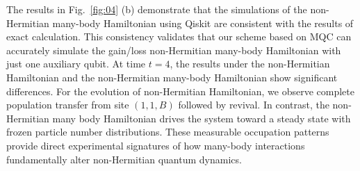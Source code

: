 \documentclass[longbibliography, aps, prx, amsmath, amssymb, amsfonts, twocolumn,superscriptaddress, footinbib]{revtex4-1}
\begin{document}
	The results in Fig.~\ref{fig:04} (b) demonstrate that the simulations of the non-Hermitian many-body Hamiltonian using Qiskit are consistent with the results of exact calculation. This consistency validates that our scheme based on MQC can accurately simulate the gain/loss non-Hermitian many-body Hamiltonian with just one auxiliary qubit. 
	At time $t=4$, the results under the non-Hermitian Hamiltonian and the non-Hermitian many-body Hamiltonian show significant differences. 
	For the evolution of non-Hermitian Hamiltonian, we observe complete population transfer from site $(1,1,B)$ followed by revival.
	In contrast, the non-Hermitian many body Hamiltonian drives the system toward a steady state with frozen particle number distributions.
	These measurable occupation patterns provide direct experimental signatures of how many-body interactions fundamentally alter non-Hermitian quantum dynamics.
	
\end{document}
